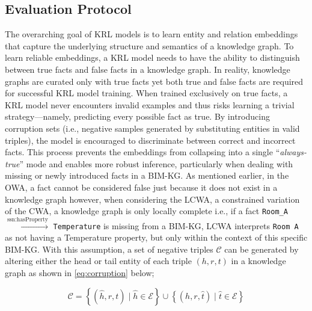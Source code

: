 \subsection{Evaluation Protocol}
\label{subsec:evaluation_protocol}

The overarching goal of \ac{KRL} models is to learn entity and relation embeddings that capture the underlying structure and semantics of a knowledge graph. To learn reliable embeddings, a \ac{KRL} model needs to have the ability to distinguish between true facts and false facts in a knowledge graph. In reality, knowledge graphs are curated only with true facts yet both true and false facts are required for successful \ac{KRL} model training. When trained exclusively on true facts, a \ac{KRL} model never encounters invalid examples and thus risks learning a trivial strategy—namely, predicting every possible fact as true. By introducing corruption sets (i.e., negative samples generated by substituting entities in valid triples), the model is encouraged to discriminate between correct and incorrect facts. This process prevents the embeddings from collapsing into a single “\textit{always-true}” mode and enables more robust inference, particularly when dealing with missing or newly introduced facts in a \ac{BIM-KG}.  As mentioned earlier, in the \ac{OWA}, a fact cannot be considered false just because it does not exist in a knowledge graph however, when considering the \ac{LCWA}, a constrained variation of the \ac{CWA}, a knowledge graph is only locally complete i.e., if a fact \texttt{Room\_A} $\xrightarrow{\text{ssn:hasProperty}}$ \texttt{Temperature} is missing from a \ac{BIM-KG}, \ac{LCWA} interprets \texttt{Room A} as not having a Temperature property, but only within the context of this specific \ac{BIM-KG}. With this assumption, a set of negative triples $\mathcal{C}$ can be generated by altering either the head or tail entity of each triple \( (h, r, t) \) in a knowledge graph as shown in \autoref{eq:corruption} below;

\begin{equation}
\label{eq:corruption}
\mathcal{C} = \left\{(\hat{h}, r, t) \mid \hat{h} \in \mathcal{E}\right\} 
\cup \left\{(h, r, \hat{t}) \mid \hat{t} \in \mathcal{E}\right\}
\end{equation}

